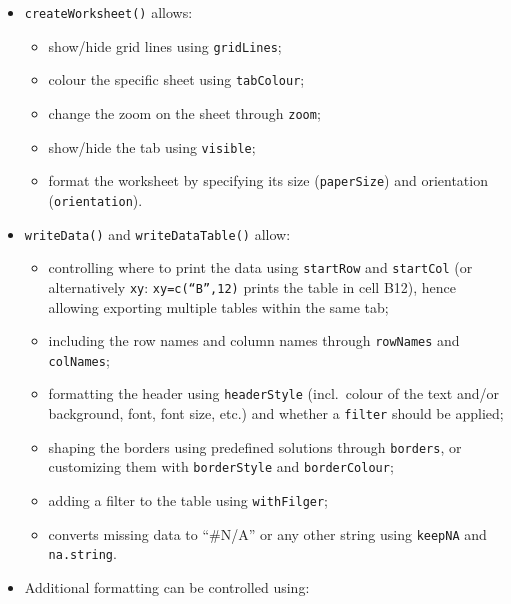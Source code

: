 \documentclass[
]{book}
\providecommand{\tightlist}{%
  \setlength{\itemsep}{0pt}\setlength{\parskip}{0pt}}
\begin{document}
\begin{itemize}
\tightlist
\item
  \texttt{createWorksheet()} allows:

  \begin{itemize}
  \tightlist
  \item
    show/hide grid lines using \texttt{gridLines};
  \item
    colour the specific sheet using \texttt{tabColour};
  \item
    change the zoom on the sheet through \texttt{zoom};
  \item
    show/hide the tab using \texttt{visible};
  \item
    format the worksheet by specifying its size (\texttt{paperSize}) and orientation (\texttt{orientation}).
  \end{itemize}
\item
  \texttt{writeData()} and \texttt{writeDataTable()} allow:

  \begin{itemize}
  \tightlist
  \item
    controlling where to print the data using \texttt{startRow} and \texttt{startCol} (or alternatively \texttt{xy}: \texttt{xy=c(“B”,12)} prints the table in cell B12), hence allowing exporting multiple tables within the same tab;
  \item
    including the row names and column names through \texttt{rowNames} and \texttt{colNames};
  \item
    formatting the header using \texttt{headerStyle} (incl.~colour of the text and/or background, font, font size, etc.) and whether a \texttt{filter} should be applied;
  \item
    shaping the borders using predefined solutions through \texttt{borders}, or customizing them with \texttt{borderStyle} and \texttt{borderColour};
  \item
    adding a filter to the table using \texttt{withFilger};
  \item
    converts missing data to ``\#N/A'' or any other string using \texttt{keepNA} and \texttt{na.string}.
  \end{itemize}
\item
  Additional formatting can be controlled using:


\end{itemize}
\end{document}
